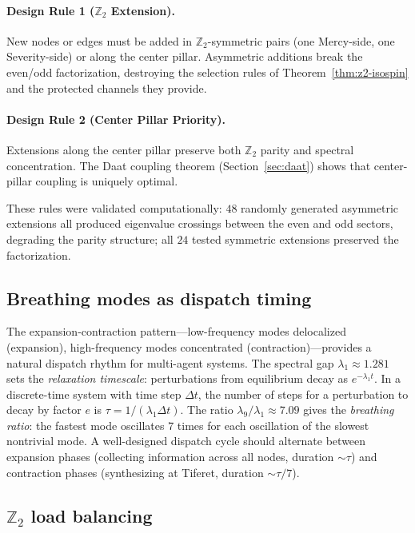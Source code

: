 \documentclass[11pt,a4paper]{amsart}
\theoremstyle{remark}
\newcommand{\bbZ}{\mathbb{Z}}
\begin{document}
\paragraph{Design Rule 1 ($\bbZ_2$ Extension).}
New nodes or edges must be added in $\bbZ_2$-symmetric pairs (one Mercy-side,
one Severity-side) or along the center pillar. Asymmetric additions break
the even/odd factorization, destroying the selection rules of
Theorem~\ref{thm:z2-isospin} and the protected channels they provide.

\paragraph{Design Rule 2 (Center Pillar Priority).}
Extensions along the center pillar preserve both $\bbZ_2$ parity and
spectral concentration. The Daat coupling theorem
(Section~\ref{sec:daat}) shows that center-pillar coupling is uniquely
optimal.

These rules were validated computationally: $48$ randomly generated
asymmetric extensions all produced eigenvalue crossings between the even
and odd sectors, degrading the parity structure; all $24$ tested symmetric
extensions preserved the factorization.

\subsection{Breathing modes as dispatch timing}
\label{sec:breathing-timing}

The expansion-contraction pattern---low-frequency modes delocalized
(expansion), high-frequency modes concentrated (contraction)---provides a
natural dispatch rhythm for multi-agent systems. The spectral gap
$\lambda_1 \approx 1.281$ sets the \emph{relaxation timescale}: perturbations
from equilibrium decay as $e^{-\lambda_1 t}$. In a discrete-time system
with time step $\Delta t$, the number of steps for a perturbation to decay
by factor $e$ is $\tau = 1 / (\lambda_1 \Delta t)$. The ratio
$\lambda_9 / \lambda_1 \approx 7.09$ gives the \emph{breathing ratio}: the
fastest mode oscillates $7$ times for each oscillation of the slowest
nontrivial mode. A well-designed dispatch cycle should alternate between
expansion phases (collecting information across all nodes, duration
$\sim \tau$) and contraction phases (synthesizing at Tiferet, duration
$\sim \tau / 7$).

\subsection{$\bbZ_2$ load balancing}
\label{sec:z2-load-balancing}
\end{document}
